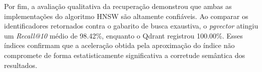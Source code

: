 \documentclass[a4paper, 12pt]{article} %
\begin{document}
Por fim, a avaliação qualitativa da recuperação demonstrou que ambas as implementações do algoritmo HNSW são altamente confiáveis. Ao comparar os identificadores retornados contra o gabarito de busca exaustiva, o \textit{pgvector} atingiu um \textit{Recall@10} médio de 98.42\%, enquanto o Qdrant registrou 100.00\%. Esses índices confirmam que a aceleração obtida pela aproximação do índice não compromete de forma estatisticamente significativa a corretude semântica dos resultados.
\end{document}
